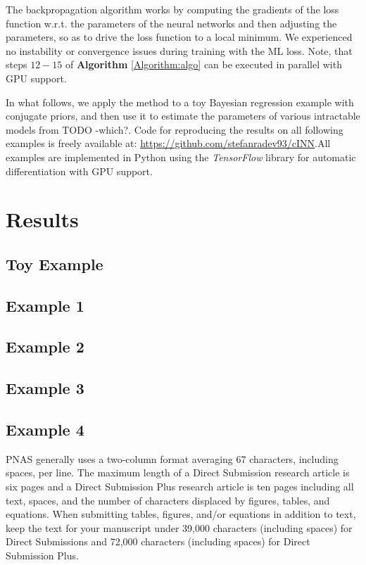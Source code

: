 \documentclass[9pt,twoside,lineno]{pnas-new}
\begin{document}
The backpropagation algorithm works by computing the gradients of the loss function w.r.t. the parameters of the neural networks and then adjusting the parameters, so as to drive the loss function to a local minimum. We experienced no instability or convergence issues during training with the ML loss. Note, that steps $12-15$ of \textbf{Algorithm} \ref{Algorithm:algo} can be executed in parallel with GPU support. 

In what follows, we apply the method to a toy Bayesian regression example with conjugate priors, and then use it to estimate the parameters of various intractable models from TODO -which?. Code for reproducing the results on all following examples is freely available at: \href{https://github.com/stefanradev93/cINN}{https://github.com/stefanradev93/cINN}.All examples are implemented in Python using the \textit{TensorFlow} library for automatic differentiation with GPU support.

\section*{Results}

\subsection*{Toy Example}

\subsection*{Example 1}

\subsection*{Example 2}

\subsection*{Example 3}

\subsection*{Example 4}

PNAS generally uses a two-column format averaging 67 characters, including spaces, per line. The maximum length of a Direct Submission research article is six pages and a Direct Submission Plus research article is ten pages including all text, spaces, and the number of characters displaced by figures, tables, and equations.  When submitting tables, figures, and/or equations in addition to text, keep the text for your manuscript under 39,000 characters (including spaces) for Direct Submissions and 72,000 characters (including spaces) for Direct Submission Plus.
\end{document}
